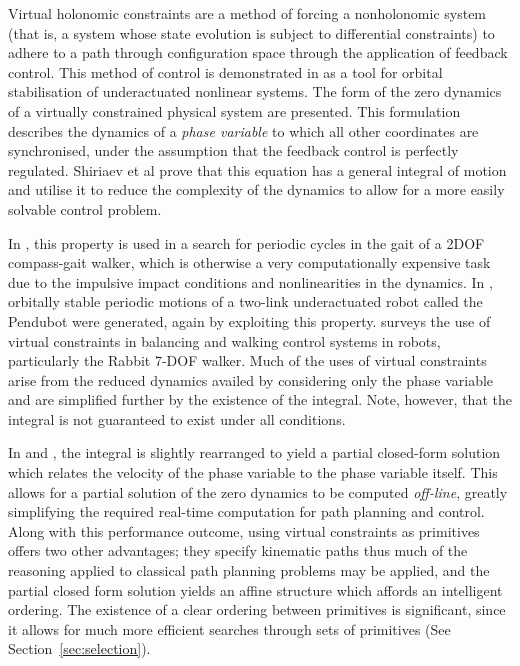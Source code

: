 Virtual holonomic constraints are a method of forcing a nonholonomic system (that is, a system whose state evolution is subject to differential constraints) to adhere to a path through configuration space through the application of feedback control. This method of control is demonstrated in \cite{shiriaev2005constructive} as a tool for orbital stabilisation of underactuated nonlinear systems. The form of the zero dynamics of a virtually constrained physical system are presented. This formulation describes the dynamics of a \textit{phase variable} to which all other coordinates are synchronised, under the assumption that the feedback control is perfectly regulated. Shiriaev et al prove that this equation has a general integral of motion and utilise it to reduce the complexity of the dynamics to allow for a more easily solvable control problem. 

In \cite{freidovich2009passive}, this property is used in a search for periodic cycles in the gait of a 2DOF compass-gait walker, which is otherwise a very computationally expensive task due to the impulsive impact conditions and nonlinearities in the dynamics. In \cite{freidovich2008periodic}, orbitally stable periodic motions of a two-link underactuated robot called the Pendubot were generated, again by exploiting this property. \cite{canudas2004concept} surveys the use of virtual constraints in balancing and walking control systems in robots, particularly the Rabbit 7-DOF walker. Much of the uses of virtual constraints arise from the reduced dynamics availed by considering only the phase variable and are simplified further by the existence of the integral. Note, however, that the integral is not guaranteed to exist under all conditions.

In \cite{manchester2011stable} and \cite{manchester13planning}, the integral is slightly rearranged to yield a partial closed-form solution which relates the velocity of the phase variable to the phase variable itself. This allows for a partial solution of the zero dynamics to be computed \textit{off-line}, greatly simplifying the required real-time computation for path planning and control. Along with this performance outcome, using virtual constraints as primitives offers two other advantages; they specify kinematic paths thus much of the reasoning applied to classical path planning problems may be applied, and the partial closed form solution yields an affine structure which affords an intelligent ordering. The existence of a clear ordering between primitives is significant, since it allows for much more efficient searches through sets of primitives (See Section~\ref{sec:selection}).

